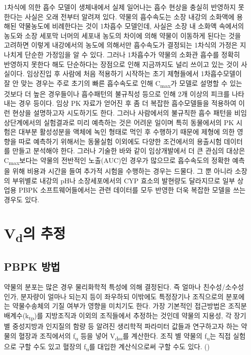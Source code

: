 \documentclass[
  11pt,
  krantz2, a4paper, twoside]{krantz}
\begin{document}
1차식에 의한 흡수 모델이 생체내에서 실제 일어나는 흡수 현상을 충실히 반영하지 못한다는 사실은 오래 전부터 알려져 있다. 약물의 흡수속도는 소장 내강의 소화액에 용해된 약물농도에 비례한다는 것이 1차흡수 모델인데, 사실은 소장 내 소화액 속에서의 농도와 소장 세포막 너머의 세포내 농도의
차이에 의해 약물이 이동하게 된다는 것을 고려하면 이렇게 내강에서의
농도에 의해서만 흡수속도가 결정되는 1차식의 가정은 지나치게 단순한
가정임을 알 수 있다. 그러나 1차흡수가 약물의 소화관 흡수를 정확히
반영하지 못한다 해도 단순하다는 장점으로 인해 지금까지도 널리 쓰이고
있는 것이 사실이다. 임상진입 후 사람에 처음 적용하기 시작하는 초기
제형들에서 1차흡수모델이 잘 안 맞는 경우는 주로 초기의 빠른 흡수속도로
인해 C\textsubscript{max}가 모델로 설명할 수 있는 것보다 더 높은 경우들이나 흡수패턴의
불규칙성 등으로 인해 2개 이상의 피크를 나타내는 경우 등이다. 임상 PK
자료가 얻어진 후 좀 더 복잡한 흡수모델들을 적용하여 이런 현상을
설명하고자 시도하기도 한다. 그러나 사람에서의 불규칙한 흡수 패턴을
비임상단계에서의 실험결과로 미리 예측하는 것은 어려운 일이며 특히
동물에서의 PK 시험은 대부분 활성성분을 액체에 녹인 형태로 먹인 후
수행하기 때문에 제형에 의한 영향을 따로 예측하기 위해서는 동물실험
이외에도 다양한 조건에서의 용출시험 데이터를 만들고 분석해야 한다.
그러나 기술한 바와 같이 임상개발에서 더 큰 관심의 대상은 C\textsubscript{max}보다는
약물의 전반적인 노출(AUC)인 경우가 많으므로 흡수속도의 정확한 예측을
위해 비용과 시간을 들여 추가적 시험을 수행하는 경우는 드물다. 그 뿐
아니라 소장의 부위별로 내강의 pH나 소장세포에서의 CYP 효소의 발현량도
달라지므로 일부 상업용 PBPK 소프트웨어들에서는 관련 데이터를 모두 반영한
더욱 복잡한 모델을 쓰는 경우도 있다.

\section{\texorpdfstring{V\textsubscript{d}의 추정}{Vd의 추정}}\label{vduxc758-uxcd94uxc815}

\subsection{PBPK 방법}\label{pbpk-uxbc29uxbc95}

약물의 분포는 많은 경우 물리화학적 특성에 의해 결정된다. 즉 얼마나
친수성/소수성인가, 분자량이 얼마나 되는지 등이 좌우하되 이밖에도
특정장기나 조직으로의 분포에는 약물수송체의 기질 여부가 영향을 미치기도
한다. 가장 기본적인 접근방법은 조직분배계수(k\textsubscript{tp})를 지방조직과 이외의
조직들에서 추정하는 것인데 약물의 지용성, 각 장기별 중성지방과 인지질의
함량 등 알려진 생리학적 파라미터 값들과 연구하고자 하는 약물의 혈장과
조직에서의 f\textsubscript{u} 등을 넣어 V\textsubscript{dss}를 계산한다. 조직 별 약물의 f\textsubscript{u}는 직접
실험으로 구할 수도 있고 혈장의 f\textsubscript{u}를 대입한 계산식으로써 구할 수도
있다. ()
\end{document}
